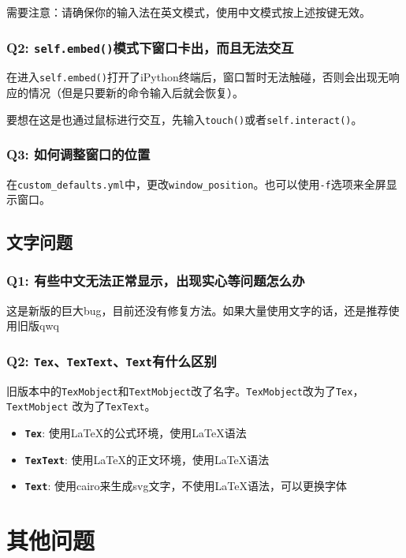 \documentclass[cn,blue,14pt,normal]{elegantnote}
\begin{document}
需要注意：请确保你的输入法在英文模式，使用中文模式按上述按键无效。

\subsubsection*{Q2: \texttt{self.embed()}模式下窗口卡出，而且无法交互}
在进入\texttt{self.embed()}打开了iPython终端后，窗口暂时无法触碰，否则会出现无响应的情况（但是只要新的命令输入后就会恢复）。

要想在这是也通过鼠标进行交互，先输入\texttt{touch()}或者\texttt{self.interact()}。

\subsubsection*{Q3: 如何调整窗口的位置}
在\texttt{custom\_defaults.yml}中，更改\texttt{window\_position}。也可以使用\texttt{-f}选项来全屏显示窗口。

\subsection{文字问题}
\subsubsection*{Q1: 有些中文无法正常显示，出现实心等问题怎么办}
这是新版的巨大bug，目前还没有修复方法。如果大量使用文字的话，还是推荐使用旧版qwq

\subsubsection*{Q2: \texttt{Tex}、\texttt{TexText}、\texttt{Text}有什么区别}
旧版本中的\texttt{TexMobject}和\texttt{TextMobject}改了名字。\texttt{TexMobject}改为了\texttt{Tex}，\texttt{TextMobject}
改为了\texttt{TexText}。
\begin{itemize}
	\item \textbf{\texttt{Tex}}: 使用\LaTeX 的公式环境，使用\LaTeX 语法
	\item \textbf{\texttt{TexText}}: 使用\LaTeX 的正文环境，使用\LaTeX 语法
	\item \textbf{\texttt{Text}}: 使用cairo来生成svg文字，不使用\LaTeX 语法，可以更换字体
\end{itemize}

\newpage

\section{其他问题}
\end{document}
